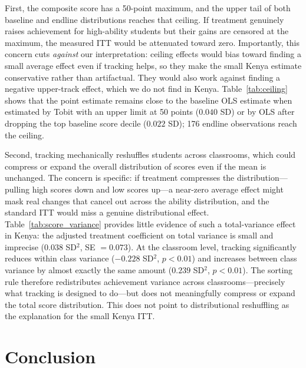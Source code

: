 \documentclass[11pt]{article}
\begin{document}
First, the composite score has a 50-point maximum, and the upper tail of both baseline and endline distributions reaches that ceiling. If treatment genuinely raises achievement for high-ability students but their gains are censored at the maximum, the measured ITT would be attenuated toward zero. Importantly, this concern cuts \emph{against} our interpretation: ceiling effects would bias toward finding a small average effect even if tracking helps, so they make the small Kenya estimate conservative rather than artifactual. They would also work against finding a negative upper-track effect, which we do not find in Kenya. Table~\ref{tab:ceiling} shows that the point estimate remains close to the baseline OLS estimate when estimated by Tobit with an upper limit at 50 points ($0.040$ SD) or by OLS after dropping the top baseline score decile ($0.022$ SD); 176 endline observations reach the ceiling.

Second, tracking mechanically reshuffles students across classrooms, which could compress or expand the overall distribution of scores even if the mean is unchanged. The concern is specific: if treatment compresses the distribution---pulling high scores down and low scores up---a near-zero average effect might mask real changes that cancel out across the ability distribution, and the standard ITT would miss a genuine distributional effect. Table~\ref{tab:score_variance} provides little evidence of such a total-variance effect in Kenya: the adjusted treatment coefficient on total variance is small and imprecise ($0.038$ SD$^2$, SE $=0.073$). At the classroom level, tracking significantly reduces within class variance ($-0.228$ SD$^2$, $p<0.01$) and increases between class variance by almost exactly the same amount ($0.239$ SD$^2$, $p<0.01$). The sorting rule therefore redistributes achievement variance across classrooms---precisely what tracking is designed to do---but does not meaningfully compress or expand the total score distribution. This does not point to distributional reshuffling as the explanation for the small Kenya ITT.

\section{Conclusion}
\label{sec:conclusion}
\end{document}
